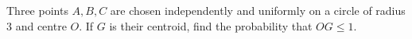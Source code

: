 Three points $A,B,C$ are chosen independently and uniformly on a circle of radius 3 and centre $O$. If $G$ is their centroid, find the probability that $OG\le1$.
